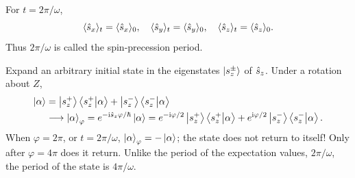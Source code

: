 For $t=2\pi/\omega$,
\begin{equation}
\langle\hat{s}_x\rangle_t=\langle\hat{s}_x\rangle_0,\quad
\langle\hat{s}_y\rangle_t=\langle\hat{s}_y\rangle_0,\quad
\langle\hat{s}_z\rangle_t=\langle\hat{s}_z\rangle_0.
\end{equation}
Thus $2\pi/\omega$ is called the spin-precession period.

Expand an arbitrary initial state in the eigenstates $\left|s_z^\pm\right\rangle$ of $\hat{s}_z$. Under a rotation about $Z$,
\begin{equation}\begin{aligned}
\left|\alpha\right\rangle&=\left|s_z^+\right\rangle\left\langle s_z^+\middle|\alpha\right\rangle+\left|s_z^-\right\rangle\left\langle s_z^-\middle|\alpha\right\rangle\\
&\longrightarrow\left|\alpha\right\rangle_\varphi
=e^{-\mathrm{i}\hat{s}_z\varphi/\hbar}\left|\alpha\right\rangle
=e^{-\mathrm{i}\varphi/2}\left|s_z^+\right\rangle\left\langle s_z^+\middle|\alpha\right\rangle
+e^{\mathrm{i}\varphi/2}\left|s_z^-\right\rangle\left\langle s_z^-\middle|\alpha\right\rangle.
\end{aligned}\end{equation}
When $\varphi=2\pi$, or $t=2\pi/\omega$, $\left|\alpha\right\rangle_\varphi=-\left|\alpha\right\rangle$; the state does not return to itself! Only after $\varphi=4\pi$ does it return. Unlike the period of the expectation values, $2\pi/\omega$, the period of the state is $4\pi/\omega$.

